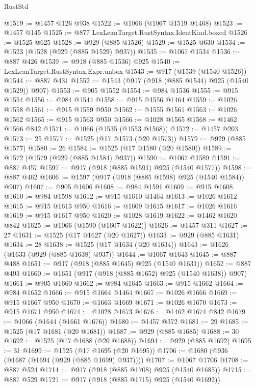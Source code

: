 \begin{lexlean}{RustStd}
\begin{coremodule}
@1519 := @1457 @126 @938
@1522 := @1066 (@1067 @1519 @1468)
@1523 := @1457 @145
@1525 := @877 LexLeanTarget.RustSyntax.IdentKind.boxed
@1526 := @1525 @625
@1528 := @929 (@885 @1526)
@1529 := @1525 @630
@1534 := @1523 (@1528 (@929 (@885 @1529) @937))
@1535 := @1067 @1534
@1536 := @887 @426
@1539 := @918 (@885 @1536) @925
@1540 := LexLeanTarget.RustSyntax.Expr.unbox
@1543 := @917 (@1539 (@1540 @1526))
@1544 := @887 @431
@1552 := @1543 (@917 (@918 (@885 @1544) @925 (@1540 @1529)) @907)
@1553 := @905 @1552
@1554 := @984 @1536
@1555 := @915 @1554
@1556 := @984 @1544
@1558 := @915 @1556 @1464
@1559 := @1026 @1558
@1561 := @915 @1559 @950
@1562 := @1555 @1561
@1563 := @1026 @1562
@1565 := @915 @1563 @950
@1566 := @1028 @1565
@1568 := @1462 @1566 @842
@1571 := @1066 (@1535 (@1553 @1568))
@1572 := @1457 @203
@1573 := 25
@1577 := @1525 (@17 @1573 (@20 @1573))
@1579 := @929 (@885 @1577)
@1580 := 26
@1584 := @1525 (@17 @1580 (@20 @1580))
@1589 := @1572 (@1579 (@929 (@885 @1584) @937))
@1590 := @1067 @1589
@1591 := @887 @457
@1597 := @917 (@918 (@885 @1591) @925 (@1540 @1577))
@1598 := @887 @462
@1606 := @1597 (@917 (@918 (@885 @1598) @925 (@1540 @1584)) @907)
@1607 := @905 @1606
@1608 := @984 @1591
@1609 := @915 @1608
@1610 := @984 @1598
@1612 := @915 @1610 @1464
@1613 := @1026 @1612
@1615 := @915 @1613 @950
@1616 := @1609 @1615
@1617 := @1026 @1616
@1619 := @915 @1617 @950
@1620 := @1028 @1619
@1622 := @1462 @1620 @842
@1625 := @1066 (@1590 (@1607 @1622))
@1626 := @1457 @311
@1627 := 27
@1631 := @1525 (@17 @1627 (@20 @1627))
@1633 := @929 (@885 @1631)
@1634 := 28
@1638 := @1525 (@17 @1634 (@20 @1634))
@1643 := @1626 (@1633 (@929 (@885 @1638) @937))
@1644 := @1067 @1643
@1645 := @887 @488
@1651 := @917 (@918 (@885 @1645) @925 (@1540 @1631))
@1652 := @887 @493
@1660 := @1651 (@917 (@918 (@885 @1652) @925 (@1540 @1638)) @907)
@1661 := @905 @1660
@1662 := @984 @1645
@1663 := @915 @1662
@1664 := @984 @1652
@1666 := @915 @1664 @1464
@1667 := @1026 @1666
@1669 := @915 @1667 @950
@1670 := @1663 @1669
@1671 := @1026 @1670
@1673 := @915 @1671 @950
@1674 := @1028 @1673
@1676 := @1462 @1674 @842
@1679 := @1066 (@1644 (@1661 @1676))
@1680 := @1457 @372
@1681 := 29
@1685 := @1525 (@17 @1681 (@20 @1681))
@1687 := @929 (@885 @1685)
@1688 := 30
@1692 := @1525 (@17 @1688 (@20 @1688))
@1694 := @929 (@885 @1692)
@1695 := 31
@1699 := @1525 (@17 @1695 (@20 @1695))
@1706 := @1680 (@936 (@1687 (@1694 (@929 (@885 @1699) @937))))
@1707 := @1067 @1706
@1708 := @887 @524
@1714 := @917 (@918 (@885 @1708) @925 (@1540 @1685))
@1715 := @887 @529
@1721 := @917 (@918 (@885 @1715) @925 (@1540 @1692))

\end{coremodule}
\end{lexlean}
